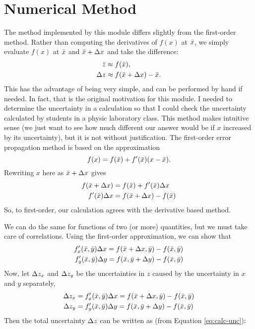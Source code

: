 \documentclass[letterpaper,10pt]{article}
\begin{document}
\section{Numerical Method}
\label{sec-numrical-method}

The method implemented by this module differs slightly from the first-order method. Rather than computing the derivatives of $f(x)$ at $\bar{x}$, we simply evaluate $f(x)$ at $\bar{x}$ and $\bar{x} + \Delta{x}$ and take the difference:
$$
\begin{aligned}
  \bar{z} &\approx f(\bar{x}), \\
  \Delta{z} &\approx f(\bar{x} + \Delta{x}) - \bar{x}.
\end{aligned}
$$
This has the advantage of being very simple, and can be performed by hand if needed. In fact, that is the original motivation for this module. I needed to determine the uncertainty in a calculation so that I could check the uncertainty
calculated by students in a physic laboratory class. This method makes intuitive sense (we just want to see how much different our answer would be if $x$ increased by its uncertainty), but it is not without justification. The first-order
error propagation method is based on the approximation
$$
f(x) = f(\bar{x}) + f^{\prime}(\bar{x})(x - \bar{x}).
$$
Rewriting $x$ here as $\bar{x} + \Delta{x}$ gives
$$
\begin{aligned}
f(\bar{x} + \Delta{x}) &= f(\bar{x}) + f^{\prime}(\bar{x})\Delta{x} \\
f^{\prime}(\bar{x})\Delta{x} &= f(\bar{x} + \Delta{x}) - f(\bar{x})
\end{aligned}
$$
So, to first-order, our calculation agrees with the derivative based method.

We can do the same for functions of two (or more) quantities, but we must take care of correlations. Using the first-order approximation, we can show that
$$
\begin{aligned}
f^{\prime}_x(\bar{x},\bar{y})\Delta{x} = f(\bar{x} + \Delta{x},\bar{y}) - f(\bar{x},\bar{y})\\
f^{\prime}_y(\bar{x},\bar{y})\Delta{y} = f(\bar{x},\bar{y} + \Delta{y}) - f(\bar{x},\bar{y})
\end{aligned}
$$
Now, let $\Delta{z}_x$ and $\Delta{z}_y$ be the uncertainties in $z$ caused by the uncertainty in $x$ and $y$ separately,
$$
\begin{aligned}
\Delta{z}_{x} &= f^{\prime}_x(\bar{x},\bar{y})\Delta{x} =  f(\bar{x} + \Delta{x},\bar{y}) - f(\bar{x},\bar{y})\\
\Delta{z}_{y} &= f^{\prime}_y(\bar{x},\bar{y})\Delta{y} =  f(\bar{x},\bar{y} + \Delta{y}) - f(\bar{x},\bar{y})
\end{aligned}
$$
Then the total uncertainty $\Delta{z}$ can be written as (from Equation \ref{eq:calc-unc}):
\end{document}
